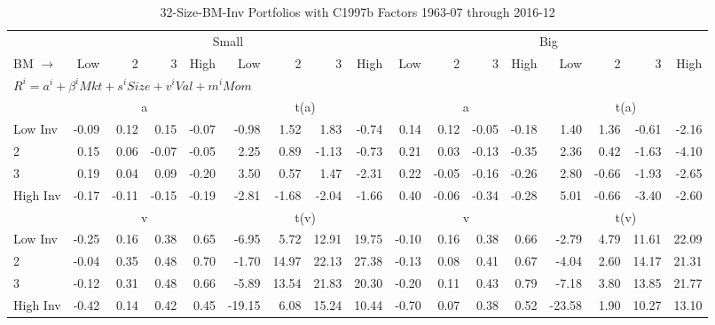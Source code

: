 
\begin{table}[!ht]
\centering
\caption{32-Size-BM-Inv Portfolios with C1997b Factors 1963-07 through 2016-12}
\begin{tabular}{lrrrrrrrrrrrrrrrr}
  \toprule
    & \multicolumn{8}{c}{Small} & \multicolumn{8}{c}{Big} \\
      \cmidrule(r){2-9} \cmidrule(r){10-17}
    BM $\rightarrow$ & Low & 2 & 3 & High & Low & 2 & 3 & High & Low & 2 & 3 & High & Low & 2 & 3 & High \\ 
  \midrule
  \multicolumn{17}{l}{$R^i=a^i+\beta^iMkt+s^iSize+v^iVal+m^iMom$} \\

  
    
      & \multicolumn{4}{c}{a} & \multicolumn{4}{c}{t(a)}
    
      & \multicolumn{4}{c}{a} & \multicolumn{4}{c}{t(a)}
    
    \\
      \cmidrule(r){2-5} \cmidrule(r){6-9} \cmidrule(r){10-13} \cmidrule(r){14-17}

    Low Inv   & -0.09  & 0.12  & 0.15  & -0.07  & -0.98  & 1.52  & 1.83  & -0.74  & 0.14  & 0.12  & -0.05  & -0.18  & 1.40  & 1.36  & -0.61  & -2.16  \\
           2  & 0.15  & 0.06  & -0.07  & -0.05  & 2.25  & 0.89  & -1.13  & -0.73  & 0.21  & 0.03  & -0.13  & -0.35  & 2.36  & 0.42  & -1.63  & -4.10  \\
           3  & 0.19  & 0.04  & 0.09  & -0.20  & 3.50  & 0.57  & 1.47  & -2.31  & 0.22  & -0.05  & -0.16  & -0.26  & 2.80  & -0.66  & -1.93  & -2.65  \\
    High Inv  & -0.17  & -0.11  & -0.15  & -0.19  & -2.81  & -1.68  & -2.04  & -1.66  & 0.40  & -0.06  & -0.34  & -0.28  & 5.01  & -0.66  & -3.40  & -2.60  \\

  
    
      & \multicolumn{4}{c}{v} & \multicolumn{4}{c}{t(v)}
    
      & \multicolumn{4}{c}{v} & \multicolumn{4}{c}{t(v)}
    
    \\
      \cmidrule(r){2-5} \cmidrule(r){6-9} \cmidrule(r){10-13} \cmidrule(r){14-17}

    Low Inv   & -0.25  & 0.16  & 0.38  & 0.65  & -6.95  & 5.72  & 12.91  & 19.75  & -0.10  & 0.16  & 0.38  & 0.66  & -2.79  & 4.79  & 11.61  & 22.09  \\
           2  & -0.04  & 0.35  & 0.48  & 0.70  & -1.70  & 14.97  & 22.13  & 27.38  & -0.13  & 0.08  & 0.41  & 0.67  & -4.04  & 2.60  & 14.17  & 21.31  \\
           3  & -0.12  & 0.31  & 0.48  & 0.66  & -5.89  & 13.54  & 21.83  & 20.30  & -0.20  & 0.11  & 0.43  & 0.79  & -7.18  & 3.80  & 13.85  & 21.77  \\
    High Inv  & -0.42  & 0.14  & 0.42  & 0.45  & -19.15  & 6.08  & 15.24  & 10.44  & -0.70  & 0.07  & 0.38  & 0.52  & -23.58  & 1.90  & 10.27  & 13.10  \\


\end{tabular}
\end{table}
